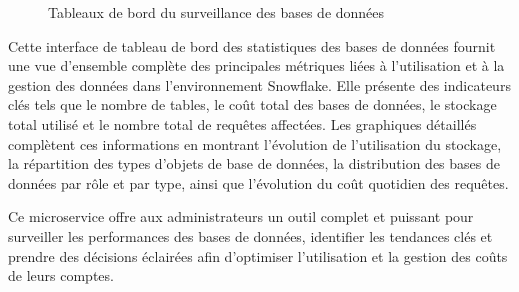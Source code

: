 \begin{itemize}
\begin{figure}[H]
                \caption{Tableaux de bord du surveillance des bases de données}
                    \label{fig:objects}
                \end{figure}
                \par Cette interface de tableau de bord des statistiques des bases de données fournit une vue d'ensemble complète des principales métriques liées à l'utilisation et à la gestion des données dans l'environnement Snowflake. 
                Elle présente des indicateurs clés tels que le nombre de tables, le coût total des bases de données, le stockage total utilisé et le nombre total de requêtes affectées.
                Les graphiques détaillés complètent ces informations en montrant l'évolution de l'utilisation du stockage, la répartition des types d'objets de base de données, la distribution des bases de données par rôle et par type, ainsi que l'évolution du coût quotidien des requêtes. \\ 
                
\end{itemize}
\par Ce microservice  offre aux administrateurs un outil complet et puissant pour surveiller les performances des bases de données, identifier les tendances clés et prendre des décisions éclairées afin d'optimiser l'utilisation et la gestion des coûts de leurs comptes.
